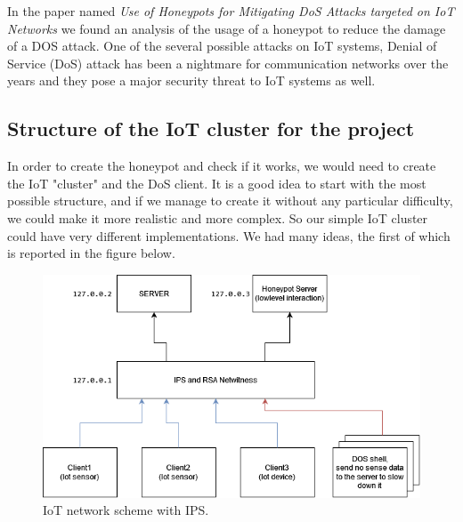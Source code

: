 In the paper named \textit{Use of Honeypots for Mitigating DoS Attacks 
targeted on IoT Networks}\cite{7944057} we found an analysis of the usage of a honeypot to reduce the damage of a DOS attack. One of the several possible attacks on IoT 
systems, Denial of Service (DoS) attack has been a nightmare for 
communication networks over the years and they 
pose a major security threat to IoT systems as well.\\

\subsection{Structure of the IoT cluster for the project}
In order to create the honeypot and check if it works, we would need to create the IoT "cluster" and the DoS client. It is a good idea to start with the most possible structure, and if we manage to create it without any particular difficulty, we could make it more realistic and more complex. So our simple IoT cluster could have very different implementations. We had many ideas, the first of which is reported in the figure below.\\

\begin{figure}[h!]
  \centering
  \includegraphics[width = 15cm]{images/IOTIPS.drawio.png}
  \caption{IoT network scheme with IPS.}
  \label{fig:2period}
\end{figure}
\FloatBarrier

